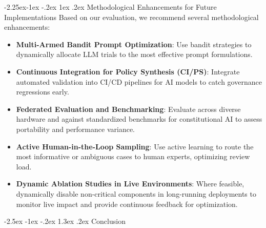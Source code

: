\documentclass[manuscript,screen,9pt]{acmart}
\makeatletter
\renewcommand\section{\@startsection{section}{1}{\z@}%
  {-2.5ex \@plus -1ex \@minus -.2ex}%
  {1.3ex \@plus.2ex}%
  {\normalfont\Large\bfseries}}
\renewcommand\subsection{\@startsection{subsection}{2}{\z@}%
  {-2.25ex\@plus -1ex \@minus -.2ex}%
  {1ex \@plus .2ex}%
  {\normalfont\large\bfseries}}
\makeatother
\begin{document}
\subsection{Methodological Enhancements for Future Implementations}
\label{subsec:methodology_optimization}
Based on our evaluation, we recommend several methodological enhancements:
\begin{itemize}[leftmargin=*,itemsep=1pt,parsep=1pt]
	\item \textbf{Multi-Armed Bandit Prompt Optimization}: Use bandit strategies to dynamically allocate LLM trials to the most effective prompt formulations.
	\item \textbf{Continuous Integration for Policy Synthesis (CI/PS)}: Integrate automated validation into CI/CD pipelines for AI models to catch governance regressions early.
	\item \textbf{Federated Evaluation and Benchmarking}: Evaluate across diverse hardware and against standardized benchmarks for constitutional AI to assess portability and performance variance.
	\item \textbf{Active Human-in-the-Loop Sampling}: Use active learning to route the most informative or ambiguous cases to human experts, optimizing review load.
	\item \textbf{Dynamic Ablation Studies in Live Environments}: Where feasible, dynamically disable non-critical components in long-running deployments to monitor live impact and provide continuous feedback for optimization.
\end{itemize}


\section{Conclusion}
\label{sec:conclusion}
\end{document}

